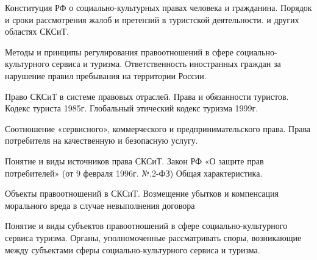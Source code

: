 \documentclass[
	14pt,
	a4paper,
	]
	{scrartcl}
\begin{document}
\shapk
{}
\setcounter{zad}{0}

\vfill
\z Конституция РФ о социально-культурных правах человека и гражданина.
 \vfill
\z Порядок и сроки рассмотрения жалоб и претензий в туристской деятельности. и других областях СКСиТ. \vfill

\vfill

\newpage


\shapk
{}
\setcounter{zad}{0}

\vfill
\z Методы и принципы регулирования правоотношений в сфере социально-культурного сервиса и туризма.
 \vfill
\z Ответственность иностранных граждан за нарушение правил пребывания на территории России.
 \vfill

\vfill

\newpage


\shapk
{}
\setcounter{zad}{0}

\vfill
\z Право СКСиТ в системе правовых отраслей.
 \vfill
\z Права и обязанности туристов. Кодекс туриста 1985г. Глобальный этический кодекс туризма 1999г.
 \vfill

\vfill

\newpage


\shapk
{}
\setcounter{zad}{0}

\vfill
\z Соотношение «сервисного», коммерческого и предпринимательского права.
 \vfill
\z Права потребителя на качественную и безопасную услугу.
 \vfill

\vfill

\newpage


\shapk
{}
\setcounter{zad}{0}

\vfill
\z Понятие и виды источников права СКСиТ.
 \vfill
\z Закон РФ «О защите прав потребителей» (от 9 февраля 1996г. №.2-ФЗ) Общая характеристика.
 \vfill

\vfill

\newpage


\shapk
{}
\setcounter{zad}{0}

\vfill
\z Объекты правоотношений в СКСиТ.
 \vfill
\z Возмещение убытков и компенсация морального вреда в случае невыполнения договора
 \vfill

\vfill

\newpage


\shapk
{}
\setcounter{zad}{0}

\vfill
\z Понятие и виды субъектов правоотношений в сфере социально-культурного сервиса туризма.
 \vfill
\z Органы, уполномоченные рассматривать споры, возникающие между субъектами сферы социально-культурного сервиса и туризма.
 \vfill
\end{document}
